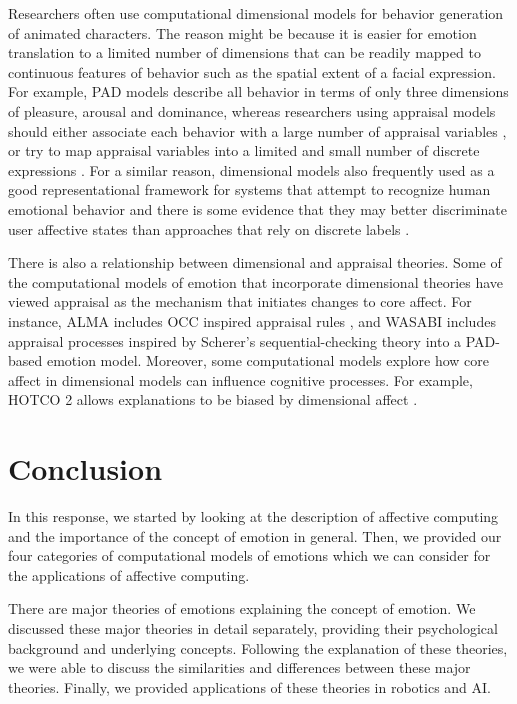 \documentclass[11pt]{article}
\begin{document}
Researchers often use computational dimensional models for behavior generation
of animated characters. The reason might be because it is easier for emotion
translation to a limited number of dimensions that can be readily mapped to
continuous features of behavior such as the spatial extent of a facial
expression. For example, PAD models describe all behavior in terms of only three
dimensions of pleasure, arousal and dominance, whereas researchers using
appraisal models should either associate each behavior with a large number of
appraisal variables \cite{scherer:expression-appraisal}
\cite{smith:computational-facial-expression}, or try to map appraisal variables
into a limited and small number of discrete expressions
\cite{elliott:affective-reasoner}. For a similar reason, dimensional models also
frequently used as a good representational framework for systems that attempt to
recognize human emotional behavior and there is some evidence that they may
better discriminate user affective states than approaches that rely on discrete
labels \cite{barrett:emotions-natural}.

There is also a relationship between dimensional and appraisal theories. Some of
the computational models of emotion that incorporate dimensional theories have
viewed appraisal as the mechanism that initiates changes to core affect. For
instance, ALMA \cite{gebhard:alma} includes OCC inspired appraisal rules
\cite{occ:structure}, and WASABI \cite{becker:wasabi} includes appraisal
processes inspired by Scherer's sequential-checking theory into a PAD-based
emotion model. Moreover, some computational models explore how core affect in
dimensional models can influence cognitive processes. For example, HOTCO 2
\cite{thagard:emotional-coherence} allows explanations to be biased by
dimensional affect \cite{marsella:computational-models}.

\section{Conclusion}
\label{sec:conclusion}

In this response, we started by looking at the description of affective
computing and the importance of the concept of emotion in general. Then, we
provided our four categories of computational models of emotions which we can
consider for the applications of affective computing.

There are major theories of emotions explaining the concept of emotion. We
discussed these major theories in detail separately, providing their
psychological background and underlying concepts. Following the explanation of
these theories, we were able to discuss the similarities and differences between
these major theories. Finally, we provided applications of these theories in
robotics and AI.
\end{document}
